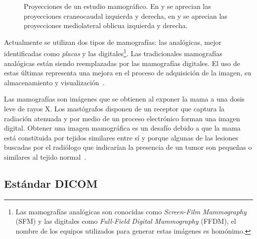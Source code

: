 \begin{figure}[h]
    \centering

    \hspace{1cm}

    \bigskip

    \hspace{1cm}

  \caption[Proyecciones de un estudio mamográfico]{Proyecciones de un estudio
  mamográfico. En \protect{} y \protect{} se aprecian las
  proyecciones craneocaudal izquierda y derecha, en \protect{} y
  \protect{} se aprecian las proyecciones mediolateral oblicua
  izquierda y derecha.}
  
  \label{fig:views}
\end{figure}

Actualmente se utilizan dos tipos de mamografías: las analógicas, mejor
identificadas como \textit{placas} y las digitales\footnote{Las mamografías
analógicas son conocidas como \textit{Screen-Film Mammography} (SFM) y las
digitales como \textit{Full-Field Digital Mammography} (FFDM), el nombre de los
equipos utilizados para generar estas imágenes es homónimo.}. Las tradicionales
mamografías analógicas están siendo reemplazadas por las mamografías digitales.
El uso de estas últimas representa una mejora en el proceso de adquisición de
la imagen, su almacenamiento y visualización~\cite{pisano2000current}. 

Las mamografías son imágenes que se obtienen al exponer la mama a una dosis
leve de rayos X. Los mastógrafos disponen de un receptor que captura la
radiación atenuada y por medio de un proceso electrónico forman una imagen
digital. Obtener una imagen mamográfica es un desafío debido a que la mama está
constituida por tejidos similares entre sí y porque algunas de las lesiones
buscadas por el radiólogo que indicarían la presencia de un tumor son pequeñas
o similares al tejido normal~\cite{mxcancer}. 

\subsection{Estándar DICOM}

